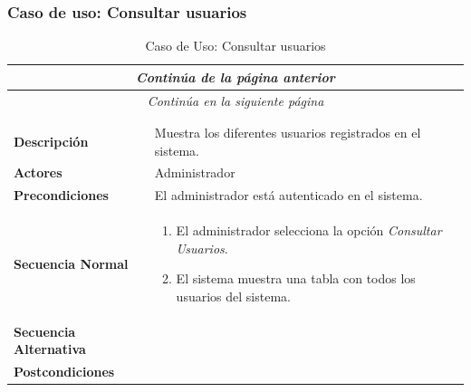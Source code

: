 \newpage
\subsubsection*{Caso de uso: Consultar usuarios }
\begin{longtable}{| p{4cm} | p{10cm} |}
\endfirsthead
\multicolumn{2}{c}{\textit{Continúa de la página anterior}}\\[12pt]
\hline
\endhead
\hline
\multicolumn{2}{c}{\textit{Continúa en la siguiente página}} \\
\endfoot
\hline
\caption{Caso de Uso: Consultar usuarios}\label{fig:1}\\
\endlastfoot


\hline
\multicolumn{2}{|c|}{\textbf{CU$<$22$>$ - Consultar Usuarios}} \\

\hline
\textbf{Descripción} &
Muestra los diferentes usuarios registrados en el sistema.\\

\hline
\textbf{Actores} &
Administrador\\

\hline
\textbf{Precondiciones} &
El administrador está autenticado en el sistema.\\

\hline
\textbf{Secuencia Normal} &\mbox{}\par\vspace{-\baselineskip}
\begin{enumerate}[leftmargin=0.7cm, topsep=0.1cm]
\item El administrador selecciona la opción \textit{Consultar Usuarios}.
\item El sistema muestra una tabla con todos los usuarios del sistema.
\end{enumerate}


\\
\hline
\textbf{Secuencia Alternativa} &\mbox{}\par\vspace{-\baselineskip}
\\

\hline
\textbf{Postcondiciones} & \\
\hline
\end{longtable}



\newpage
